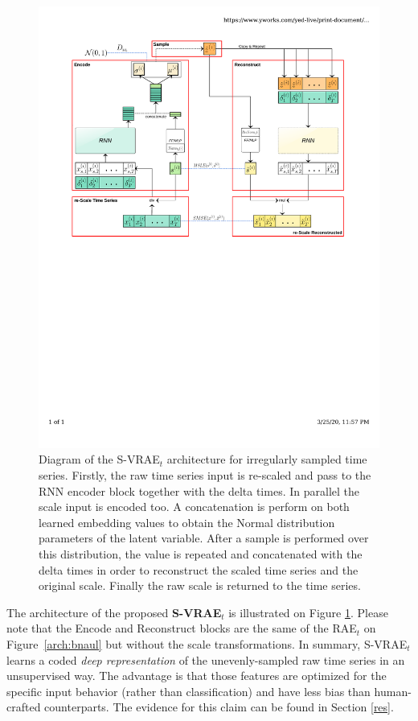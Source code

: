 \begin{figure}[!t]
    \centering
    \includegraphics[width=\textwidth]{imgs/svrae_model.pdf}
    \caption{Diagram of the S-VRAE$_t$ architecture for irregularly sampled time series. Firstly, the raw time series input is re-scaled and pass to the RNN encoder block together with the delta times. In parallel the scale input is encoded too. A concatenation is perform on both learned embedding values to obtain the Normal distribution parameters of the latent variable. After a sample is performed over this distribution, the value is repeated and concatenated with the delta times in order to reconstruct the scaled time series and the original scale. Finally the raw scale is returned to the time series.}
    \label{arch:svrae_ill}
\end{figure}
The  architecture of the proposed \textbf{S-VRAE$_t$} is illustrated on Figure \ref{arch:svrae_ill}. Please note that the Encode and Reconstruct blocks are the same of the RAE$_t$ on Figure~\ref{arch:bnaul} but without the scale transformations. 
In summary, S-VRAE$_t$ learns a coded \textit{deep representation} of the unevenly-sampled raw time series in an unsupervised way. The advantage is that those features are optimized for the specific input behavior (rather than classification) and have less bias than human-crafted counterparts. The evidence for this claim can be found in Section \ref{res}.

